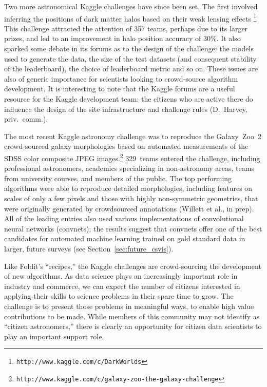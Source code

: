 \documentclass{ar2e}
\def\Sref#1{Section~\ref{#1}\xspace}
\def\url#1{\texttt{#1}}
\begin{document}
Two more astronomical Kaggle challenges have since been set. The first
involved inferring the positions of dark matter halos based on their weak
lensing effects
\citep{Harvey++2014}\footnote{\url{http://www.kaggle.com/c/DarkWorlds}}  This
challenge attracted the attention of 357 teams, perhaps due to its larger
prizes, and led to an improvement in halo position accuracy of 30\%.  It also
sparked some debate in its forums as to the design of the challenge: the
models used to generate the data, the size of the test datasets (and
consequent stability of the leaderboard),  the choice of leaderboard metric
and so on. These issues are also of generic importance for scientists looking
to crowd-source algorithm development. It is interesting to note that the
Kaggle forums are a useful resource for the Kaggle development team: the
citizens who are active there do influence the design of the site
infrastructure and challenge rules (D.~Harvey, priv.~comm.). 

The most recent
Kaggle astronomy challenge was to reproduce the Galaxy~Zoo~2 crowd-sourced
galaxy morphologies based on automated measurements of the SDSS color composite
JPEG images.\footnote{\url{http://www.kaggle.com/c/galaxy-zoo-the-galaxy-challenge}}
329~teams entered the challenge, including professional astronomers, academics
specializing in non-astronomy areas, teams from university courses, 
and members of the public. 
The top performing algorithms were able to reproduce
detailed morphologies, including features on scales of only a few pixels and
those with highly non-symmetric geometries, that were originally generated
by crowdsourced annotations (Willett et al., in prep).
All of the leading entries also used various implementations of convolutional
neural networks (convnets); the results suggest that convnets offer one of
the best candidates for automated machine learning trained on gold standard
data in larger, future surveys (see \Sref{sec:future_csvis}).



Like Foldit's ``recipes,'' the Kaggle challenges are crowd-sourcing the
development of new algorithms. As data science plays an increasingly important
role in industry and commerce, we can expect the number of citizens interested
in applying their skills to science problems in their spare time to grow. The
challenge is to present those problems in meaningful ways, to enable high value
contributions to be made. While members of this community may not identify as
``citizen astronomers,'' there is clearly an opportunity for citizen data
scientists to play an important support role.
\end{document}
